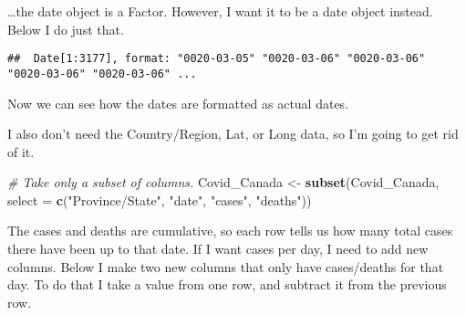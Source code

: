\documentclass[]{tufte-handout}
\newenvironment{Shaded}{}{}
\newcommand{\CommentTok}[1]{\textcolor[rgb]{0.38,0.63,0.69}{\textit{#1}}}
\newcommand{\DataTypeTok}[1]{\textcolor[rgb]{0.56,0.13,0.00}{#1}}
\newcommand{\KeywordTok}[1]{\textcolor[rgb]{0.00,0.44,0.13}{\textbf{#1}}}
\newcommand{\NormalTok}[1]{#1}
\newcommand{\OperatorTok}[1]{\textcolor[rgb]{0.40,0.40,0.40}{#1}}
\newcommand{\StringTok}[1]{\textcolor[rgb]{0.25,0.44,0.63}{#1}}
\begin{document}
\ldots the date object is a Factor. However, I want it to be a date
object instead. Below I do just that.

\begin{Shaded}
\end{Shaded}

\begin{verbatim}
##  Date[1:3177], format: "0020-03-05" "0020-03-06" "0020-03-06" "0020-03-06" "0020-03-06" ...
\end{verbatim}

Now we can see how the dates are formatted as actual dates.

I also don't need the Country/Region, Lat, or Long data, so I'm going to
get rid of it.

\begin{Shaded}
\begin{Highlighting}[]
\CommentTok{# Take only a subset of columns.}
\NormalTok{Covid_Canada <-}\StringTok{ }\KeywordTok{subset}\NormalTok{(Covid_Canada, }\DataTypeTok{select =} \KeywordTok{c}\NormalTok{(}\StringTok{"Province/State"}\NormalTok{, }\StringTok{"date"}\NormalTok{, }\StringTok{"cases"}\NormalTok{, }\StringTok{"deaths"}\NormalTok{))}
\end{Highlighting}
\end{Shaded}

The cases and deaths are cumulative, so each row tells us how many total
cases there have been up to that date. If I want cases per day, I need
to add new columns. Below I make two new columns that only have
cases/deaths for that day. To do that I take a value from one row, and
subtract it from the previous row.
\end{document}
